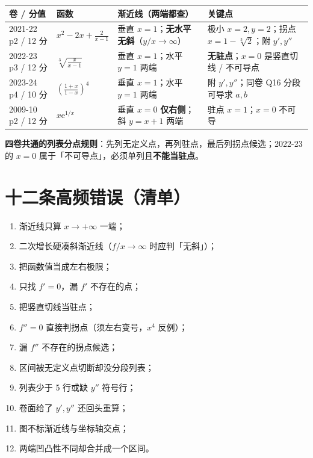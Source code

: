 \documentclass[11pt,a4paper]{ctexart}
\newcommand{\ee}{\mathrm{e}}
\begin{document}
\begin{center}
\footnotesize\setlength{\tabcolsep}{3pt}
\begin{tabular}{@{}p{2.0cm}p{3.5cm}p{4.5cm}p{5.0cm}@{}}
\toprule
卷 / 分值 & 函数 & 渐近线（两端都查） & 关键点 \\
\midrule
2021-22 p2 / 12 分 & $x^2-2x+\frac2{x-1}$ & 垂直 $x=1$；\textbf{无水平无斜}（$y/x\to\infty$） & 极小 $x=2,y=2$；拐点 $x=1-\sqrt[3]2$；附 $y',y''$ \\
2022-23 p3 / 12 分 & $\sqrt[3]{\frac{x}{x-1}}$ & 垂直 $x=1$；水平 $y=1$ 两端 & \textbf{无驻点}；$x=0$ 是竖直切线 / 不可导点 \\
2023-24 p4 / 10 分 & $\left(\frac{1+x}{1-x}\right)^4$ & 垂直 $x=1$；水平 $y=1$ 两端 & 附 $y',y''$；同卷 Q16 分段可导求 $a,b$ \\
2009-10 p2 / 12 分 & $x\ee^{1/x}$ & 垂直 $x=0$ \textbf{仅右侧}；斜 $y=x+1$ 两端 & 驻点 $x=1$；$x=0$ 不可导 \\
\bottomrule
\end{tabular}
\end{center}

\noindent\textbf{四卷共通的列表分点规则}：先列无定义点，再列驻点，最后列拐点候选；2022-23 的 $x=0$ 属于「不可导点」，必须单列且\textbf{不能当驻点}。

\section{十二条高频错误（清单）}

\begin{enumerate}[label=\arabic*.,leftmargin=2em]
\item 渐近线只算 $x\to+\infty$ 一端；
\item 二次增长硬凑斜渐近线（$f/x\to\infty$ 时应判「无斜」）；
\item 把函数值当成左右极限；
\item 只找 $f'=0$，漏 $f'$ 不存在的点；
\item 把竖直切线当驻点；
\item $f''=0$ 直接判拐点（须左右变号，$x^4$ 反例）；
\item 漏 $f''$ 不存在的拐点候选；
\item 区间被无定义点切断却没分段列表；
\item 列表少于 5 行或缺 $y''$ 符号行；
\item 卷面给了 $y',y''$ 还回头重算；
\item 图不标渐近线与坐标轴交点；
\item 两端凹凸性不同却合并成一个区间。
\end{enumerate}
\end{document}
